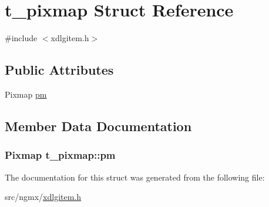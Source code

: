 \hypertarget{structt__pixmap}{\section{t\-\_\-pixmap \-Struct \-Reference}
\label{structt__pixmap}
}


{\ttfamily \#include $<$xdlgitem.\-h$>$}

\subsection*{\-Public \-Attributes}
\begin{DoxyCompactItemize}
\item 
\-Pixmap \hyperlink{structt__pixmap_a9e688e58bcee601eecb8debd2f766f56}{pm}
\end{DoxyCompactItemize}


\subsection{\-Member \-Data \-Documentation}
\hypertarget{structt__pixmap_a9e688e58bcee601eecb8debd2f766f56}{
\subsubsection[{pm}]{\setlength{\rightskip}{0pt plus 5cm}\-Pixmap {\bf t\-\_\-pixmap\-::pm}}}\label{structt__pixmap_a9e688e58bcee601eecb8debd2f766f56}


\-The documentation for this struct was generated from the following file\-:\begin{DoxyCompactItemize}
\item 
src/ngmx/\hyperlink{xdlgitem_8h}{xdlgitem.\-h}\end{DoxyCompactItemize}
